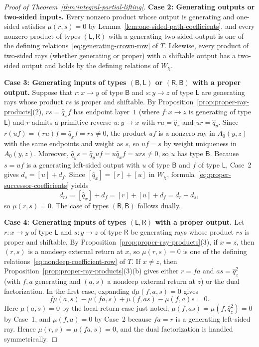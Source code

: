 \begin{proof}[Proof of Theorem~\ref{thm:integral-partial-lifting}]
\smallskip
\noindent\textbf{Case 2: Generating outputs or two-sided inputs.}
Every nonzero product whose output is generating and one-sided satisfies $\mu(r,s)=0$ by Lemma~\ref{lem:one-sided-path-coefficients}, and every nonzero product of types $(\mathsf L,\mathsf R)$ with a generating two-sided output is one of the defining relations~\eqref{eq:generating-crown-row} of $T$. Likewise, every product of two-sided rays (whether generating or proper) with a shiftable output has a two-sided output and holds by the defining relations of $W_\chi$.

\smallskip
\noindent\textbf{Case 3: Generating inputs of types $(\mathsf B,\mathsf L)$ or $(\mathsf R,\mathsf B)$ with a proper output.}
Suppose that $r\colon x\to y$ of type $\mathsf B$ and $s\colon y\to z$ of type $\mathsf L$ are generating rays whose product $rs$ is proper and shiftable. By Proposition~\ref{prop:proper-ray-products}(2), $rs=\widehat q_xf$ has endpoint layer~$1$ (where $f\colon x\to z$ is generating of type $\mathsf L$) and $r$ admits a primitive reverse $u\colon y\to x$ with $ru=\widehat q_x$ and $ur=\widehat q_y$. Since $r(uf)=(ru)f=\widehat q_xf=rs\ne0$, the product $uf$ is a nonzero ray in $A_0(y,z)$ with the same endpoints and weight as $s$, so $uf=s$ by weight uniqueness in $A_0(y,z)$. Moreover, $\widehat q_ys=\widehat q_yuf=u\widehat q_xf=urs\ne0$, so $u$ has type $\mathsf B$. Because $s=uf$ is a generating left-sided output with $u$ of type $\mathsf B$ and $f$ of type $\mathsf L$, Case~2 gives $d_s=[u]+d_f$. Since $[\widehat q_x]=[r]+[u]$ in $W_\chi$, formula~\eqref{eq:proper-successor-coefficients} yields
\[
  d_{rs}=[\widehat q_x]+d_f=[r]+[u]+d_f=d_r+d_s,
\]
so $\mu(r,s)=0$. The case of types $(\mathsf R,\mathsf B)$ follows dually.

\smallskip
\noindent\textbf{Case 4: Generating inputs of types $(\mathsf L,\mathsf R)$ with a proper output.}
Let $r\colon x\to y$ of type $\mathsf L$ and $s\colon y\to z$ of type $\mathsf R$ be generating rays whose product $rs$ is proper and shiftable. By Proposition~\ref{prop:proper-ray-products}(3), if $x=z$, then $(r,s)$ is a nondeep external return at $x$, so $\mu(r,s)=0$ is one of the defining relations~\eqref{eq:nondeep-coefficient-row} of $T$. If $x\ne z$, then Proposition~\ref{prop:proper-ray-products}(3)(b) gives either $r=fa$ and $as=\widehat q_z^2$ (with $f,a$ generating and $(a,s)$ a nondeep external return at $z$) or the dual factorization. In the first case, expanding $d\mu(f,a,s)=0$ gives
\[
  f\mu(a,s)-\mu(fa,s)+\mu(f,as)-\mu(f,a)s=0.
\]
Here $\mu(a,s)=0$ by the local-return case just noted, $\mu(f,as)=\mu(f,\widehat q_z^2)=0$ by Case~1, and $\mu(f,a)=0$ by Case~2 because $fa=r$ is a generating left-sided ray. Hence $\mu(r,s)=\mu(fa,s)=0$, and the dual factorization is handled symmetrically.


\end{proof}
